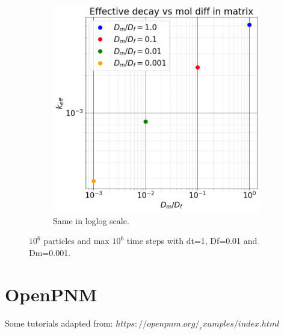 \documentclass{article}
\begin{document}
\begin{figure}[htbp]
\begin{subfigure}[b]{0.48\textwidth}
        \includegraphics[width=\textwidth]{images/kEffVsDfDmRatioLogLog.png}
        \caption{Same in loglog scale.}
    \end{subfigure}
    \caption{$10^6$ particles and max $10^6$ time steps with dt=1, Df=0.01 and Dm=0.001.}
    \label{fig:KeffVsDm}
\end{figure}

\FloatBarrier  %
\section{OpenPNM}
Some tutorials adapted from: $https://openpnm.org/_examples/index.html$
\end{document}
